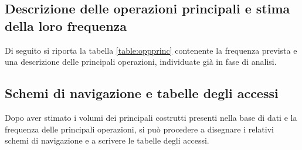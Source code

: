 \documentclass[a4paper,final,12pt]{report}
\begin{document}
\subsection{Descrizione delle operazioni principali e stima della loro frequenza}
Di seguito si riporta la tabella \ref{table:oppprinc} contenente la frequenza prevista e una descrizione delle principali operazioni, individuate già in fase di analisi.
\begin{table}[hbtp]
\centering
{}
\caption{Operazioni principali.}
\label{table:oppprinc}
\end{table}

\subsection{Schemi di navigazione e tabelle degli accessi}
Dopo aver stimato i volumi dei principali costrutti presenti nella base di dati e la 
frequenza delle principali operazioni, si può procedere a disegnare i relativi schemi 
di navigazione e a scrivere le tabelle degli accessi.
\end{document}
